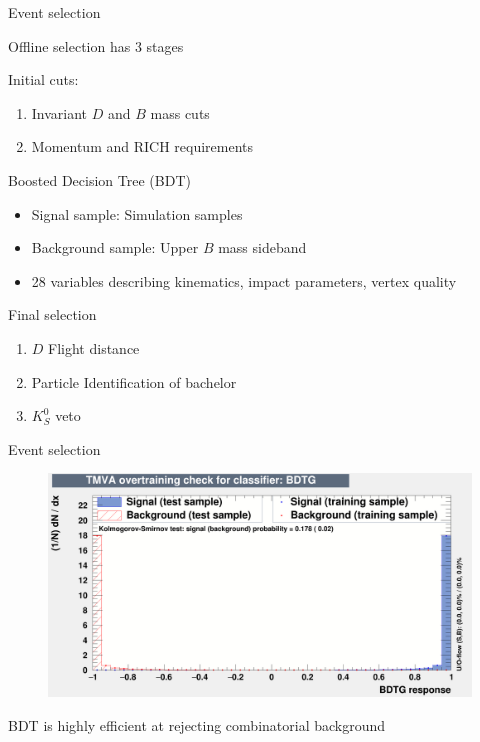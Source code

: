 \documentclass{beamer}
\begin{document}
\begin{frame}{Event selection}
  \begin{center}
    \large Offline selection has 3 stages
  \end{center}
  Initial cuts:
  \begin{enumerate}
    \item{Invariant $D$ and $B$ mass cuts}
    \item{Momentum and RICH requirements}
  \end{enumerate}
  Boosted Decision Tree (BDT)
  \begin{itemize}
    \item{Signal sample: Simulation samples}
    \item{Background sample: Upper $B$ mass sideband}
    \item{28 variables describing kinematics, impact parameters, vertex quality}
  \end{itemize}
  Final selection
  \begin{enumerate}
    \item{$D$ Flight distance}
    \item{Particle Identification of bachelor}
    \item{$K_S^0$ veto}
  \end{enumerate}
\end{frame}

\begin{frame}{Event selection}
  \begin{figure}
    \centering
    \includegraphics[width = 1.0\textwidth]{Plots/overtrain_BDTG.png}
  \end{figure}
  \begin{center}
    BDT is highly efficient at rejecting combinatorial background
  \end{center}
\end{frame}
\end{document}
